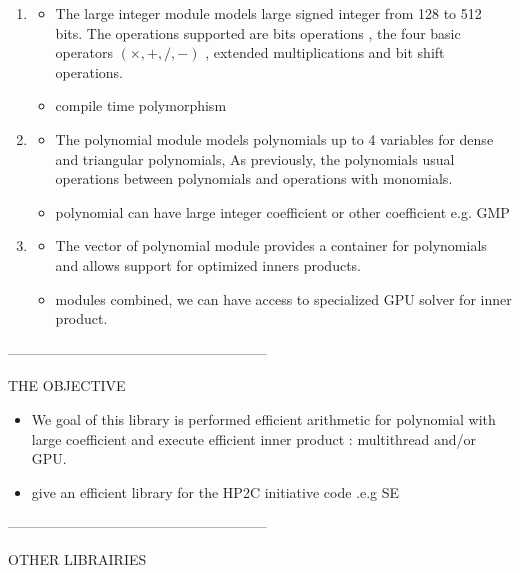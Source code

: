 \documentclass[oribibl]{llncs2e/llncs}
\begin{document}
\begin{enumerate}
\item  \begin{itemize}
\item The large integer module models large signed integer from 128 to 512 bits. The operations supported are bits operations , the four basic operators $(\times,+,/,-)$ , extended multiplications and bit shift operations. 
\item compile time polymorphism
\end{itemize}

\item \begin{itemize}
\item The polynomial module models polynomials up to 4 variables for dense and triangular polynomials, As previously, the polynomials usual  operations between polynomials and operations with monomials.  
\item polynomial can have large integer coefficient or other coefficient e.g. GMP
\end{itemize}

\item \begin{itemize}
\item The vector of polynomial module provides a container for polynomials and allows support for optimized inners products.
\item  modules combined, we can have access to specialized GPU solver for inner product.
\end{itemize}
\end{enumerate}

--------------------------------------------------------

THE OBJECTIVE

\begin{itemize}
\item  We goal of this library is performed efficient arithmetic for polynomial with large coefficient and execute efficient inner product : multithread and/or GPU.
\item give an efficient library for the HP2C initiative code .e.g  SE
\end{itemize}
--------------------------------------------------------

OTHER LIBRAIRIES
\end{document}
